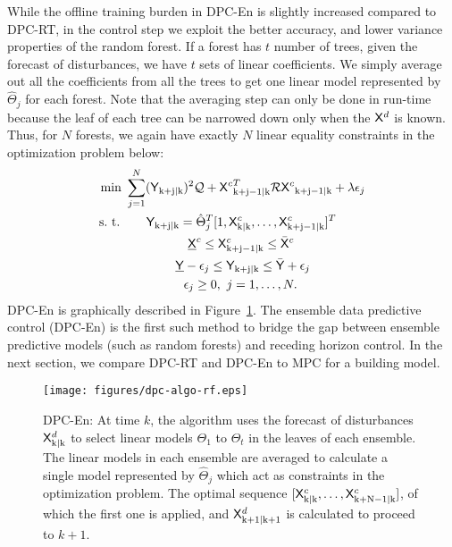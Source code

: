 While the offline training burden in DPC-En is slightly increased compared to DPC-RT, in the control step we exploit the better accuracy, and lower variance properties of the random forest. 
If a forest has $t$ number of trees, given the forecast of disturbances, we have $t$ sets of linear coefficients. We simply average out all the coefficients from all the trees to get one linear model represented by $\hat{\Theta}_j$ for each forest. Note that the averaging step can only be done in run-time because the leaf of each tree can be narrowed down only when the $\mathsf{X}^d$ is known. Thus, for $N$ forests, we again have exactly $N$ linear equality constraints in the optimization problem below:
\begin{align}
\begin{aligned}
\text{min } & \sum_{j=1}^{N} ({\mathsf{Y}}_{\mathrm{k+j|k}})^2 \mathcal{Q} + {\mathsf{X}^c}^T_{\mathrm{k+j-1|k}} \mathcal{R} {\mathsf{X}^c}_{\mathrm{k+j-1|k}} +  \lambda\epsilon_j\\
\text{s.~t. } & \ \ \ \ \ \mathsf{Y}_{\mathrm{k+j|k}} =  \hat{\Theta}^T_j [1,\mathsf{X}^c_{\mathrm{k|k}},\dots,\mathsf{X}^c_{\mathrm{k+j-1|k}} ]^T \\
& \ \ \ \ \ \ \ \ \ \ \ \ \ \ \ \underline{\mathsf{X}}^c \leq \mathsf{X}^c_{\mathrm{k+j-1|k}} \leq \bar{\mathsf{X}}^c\\ 
& \ \ \ \ \ \ \ \ \ \ \ \ \underline{\mathsf{Y}}-\epsilon_j \leq \mathsf{Y}_{\mathrm{k+j|k}} \leq \bar{\mathsf{Y}} + \epsilon_j\\\
& \ \ \ \ \ \ \ \ \ \ \ \ \ \ \epsilon_j \geq 0, \ j = 1,\dots,N.
\end{aligned}
\label{E:dpcrf}
\end{align}
DPC-En is graphically described in Figure~\ref{F:dpc-algo-rf}. The ensemble data predictive control (DPC-En) is the first such method to bridge the gap between ensemble predictive models (such as random forests) and receding horizon control. In the next section, we compare DPC-RT and DPC-En to MPC for a building model.

\begin{figure}[t!]
	\centering
	\texttt{[image: figures/dpc-algo-rf.eps]}
	\caption{DPC-En: At time $k$, the algorithm uses the forecast of disturbances $\mathsf{X}^d_{\mathrm{k|k}}$ to select linear models $\Theta_1$ to $\Theta_t$ in the leaves of each ensemble. The linear models in each ensemble are averaged to calculate a single model represented by $\hat{\Theta}_j$ which act as constraints in the optimization problem. The optimal sequence $[\mathsf{X}^c_{\mathrm{k|k}},\dots,\mathsf{X}^c_{\mathrm{k+N-1|k}}]$, of which the first one is applied, and $\mathsf{X}^d_{\mathrm{k+1|k+1}}$ is calculated to proceed to $k+1$.}
	\label{F:dpc-algo-rf}
\end{figure}